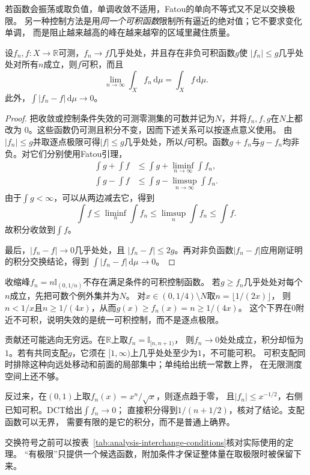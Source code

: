 若函数会振荡或取负值，单调收敛不适用，Fatou的单向不等式又不足以交换极限。
另一种控制方法是用\emph{同一个可积函数}限制所有逼近的绝对值；它不要求变化单调，
而是阻止越来越高的峰在越来越窄的区域里藏住质量。
\begin{theorem}[支配收敛定理]
\label{thm:analysis-dominated-convergence}
设$f_n,f:X\to\mathbb{R}$可测，$f_n\to f$几乎处处，并且存在非负可积函数$g$使
$|f_n|\leq g$几乎处处对所有$n$成立，则$f$可积，而且
\[   \lim_{n\to\infty}\int_Xf_n\,\mathrm{d}\mu   =   \int_Xf\,\mathrm{d}\mu. \]
此外，$\int|f_n-f|\,\mathrm{d}\mu\to0$。
\end{theorem}
\begin{proof}
把收敛或控制条件失效的可测零测集的可数并记为$N$，并将$f_n,f,g$在$N$上都改为
$0$。这些函数仍可测且积分不变，因而下述关系可以按逐点意义使用。
由$|f_n|\leq g$并取逐点极限可得$|f|\leq g$几乎处处，所以$f$可积。函数$g+f_n$与$g-f_n$均非负。对它们分别使用Fatou引理，
\begin{align*}
  \int g+\int f
  &\leq
  \int g+\liminf_{n\to\infty}\int f_n,\\
  \int g-\int f
  &\leq
  \int g-\limsup_{n\to\infty}\int f_n.
\end{align*}
由于$\int g<\infty$，可以从两边减去它，得到
\[   \int f   \leq\liminf_n\int f_n   \leq\limsup_n\int f_n   \leq\int f. \]
故积分收敛到$\int f$。

最后，$|f_n-f|\to0$几乎处处，且 $|f_n-f|\leq2g$。再对非负函数$|f_n-f|$应用刚证明的积分交换结论，得到 $\int|f_n-f|\,\mathrm{d}\mu\to0$。
\end{proof}

收缩峰$f_n=n\mathbb{I}_{(0,1/n)}$不存在满足条件的可积控制函数。
若$g\geq f_n$几乎处处对每个$n$成立，先把可数个例外集并为$N$。
对$x\in(0,1/4)\setminus N$取$n=\lfloor1/(2x)\rfloor$，
则$n<1/x$且$n\geq1/(4x)$，从而$g(x)\geq f_n(x)=n\geq1/(4x)$。
这个下界在$0$附近不可积，说明失效的是统一可积控制，而不是逐点极限。

贡献还可能逃向无穷远。在$\mathbb R$上取$f_n=\mathbb I_{[n,n+1)}$，
则$f_n\to0$处处成立，积分却恒为$1$。若有共同支配$g$，它须在
$[1,\infty)$上几乎处处至少为$1$，不可能可积。
可积支配同时排除这种向远处移动和前面的局部集中；单纯给出统一常数上界，
在无限测度空间上还不够。

反过来，在$(0,1)$上取$f_n(x)=x^n/\sqrt x$，则逐点趋于零，
且$|f_n|\leq x^{-1/2}$，右侧已知可积。DCT给出$\int f_n\to0$；
直接积分得到$1/(n+1/2)$，核对了结论。支配函数可以无界，
需要有限的是它的积分，而不是普通上确界。

交换符号之前可以按表~\ref{tab:analysis-interchange-conditions}核对实际使用的定理。
“有极限”只提供一个候选函数，附加条件才保证整体量在取极限时被保留下来。


